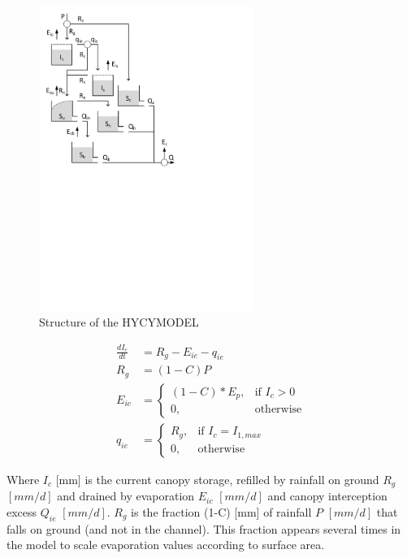 { 																	%
\begin{figure}
\includegraphics[trim=1cm 14.5cm 7cm 1cm,width=7cm,keepaspectratio]{./files/42_schematic.pdf}
\caption{Structure of the HYCYMODEL} \label{fig:00_schematic}
\end{figure}

\begin{align}
	\frac{dI_c}{dt} &= R_g-E_{ic} -q_{ie} \\
	R_g &= (1-C)P\\
	E_{ic} &= 
	\begin{cases}
		(1-C)*E_p, & \text{if } I_c > 0 \\
		0, & \text{otherwise}
	\end{cases}\\
	q_{ie} &= 	\begin{cases}
		R_g, & \text{if } I_c = I_{1,max} \\
		0, & \text{otherwise}
	\end{cases}
\end{align}

Where $I_c$ [mm] is the current canopy storage, refilled by rainfall on ground $R_g$ $[mm/d]$ and drained by evaporation $E_{ic}$ $[mm/d]$ and canopy interception excess $Q_{ie}$ $[mm/d]$.
$R_g$ is the fraction (1-C) [mm] of rainfall $P$ $[mm/d]$ that falls on ground (and not in the channel).
This fraction appears several times in the model to scale evaporation values according to surface area.

} %

